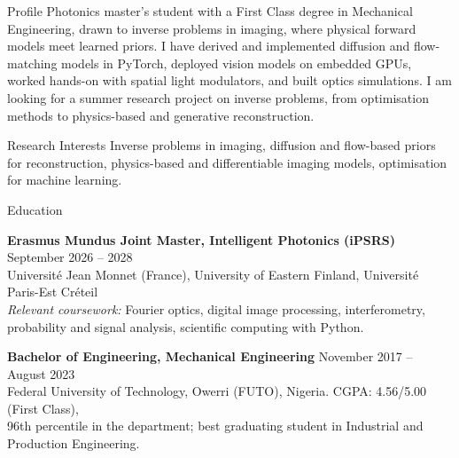 \documentclass{resume}
\begin{document}
\begin{rSection}{Profile}
Photonics master's student with a First Class degree in Mechanical Engineering, drawn to inverse problems
in imaging, where physical forward models meet learned priors. I have derived and implemented diffusion and
flow-matching models in PyTorch, deployed vision models on embedded GPUs, worked hands-on with
spatial light modulators, and built optics simulations. I am looking for a summer research project on
inverse problems, from optimisation methods to physics-based and generative reconstruction.
\end{rSection}

\begin{rSection}{Research Interests}
Inverse problems in imaging, diffusion and flow-based priors for reconstruction, physics-based and
differentiable imaging models, optimisation for machine learning.
\end{rSection}

\begin{rSection}{Education}

{\bf Erasmus Mundus Joint Master, Intelligent Photonics (iPSRS)} \hfill {September 2026 -- 2028}\\
Université Jean Monnet (France), University of Eastern Finland, Université Paris-Est Créteil\\
\textit{Relevant coursework:} Fourier optics, digital image processing, interferometry, probability and signal analysis,
scientific computing with Python.

{\bf Bachelor of Engineering, Mechanical Engineering} \hfill {November 2017 -- August 2023}\\
Federal University of Technology, Owerri (FUTO), Nigeria. CGPA: 4.56/5.00 (First Class),\\
96th percentile in the department; best graduating student in Industrial and Production Engineering.

\end{rSection}
\end{document}
